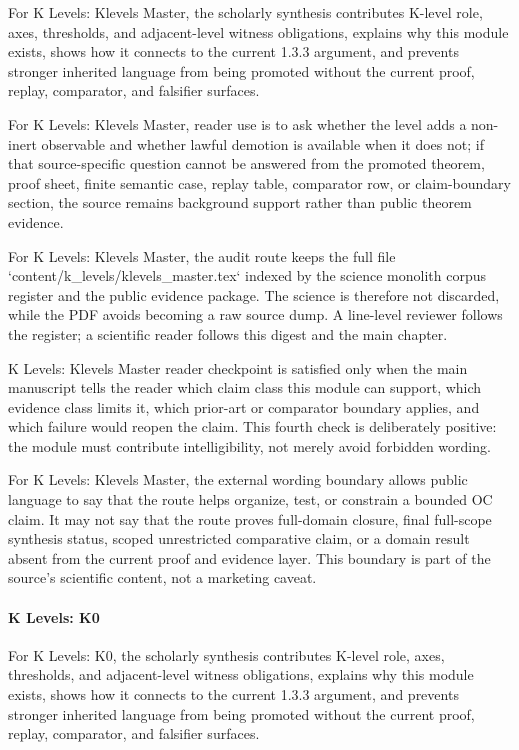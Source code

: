 For K Levels: Klevels Master, the scholarly synthesis contributes K-level role, axes, thresholds, and adjacent-level witness obligations, explains why this module exists, shows how it connects to the current 1.3.3 argument, and prevents stronger inherited language from being promoted without the current proof, replay, comparator, and falsifier surfaces.


For K Levels: Klevels Master, reader use is to ask whether the level adds a non-inert observable and whether lawful demotion is available when it does not; if that source-specific question cannot be answered from the promoted theorem, proof sheet, finite semantic case, replay table, comparator row, or claim-boundary section, the source remains background support rather than public theorem evidence.


For K Levels: Klevels Master, the audit route keeps the full file `content/k\_levels/klevels\_master.tex` indexed by the science monolith corpus register and the public evidence package. The science is therefore not discarded, while the PDF avoids becoming a raw source dump. A line-level reviewer follows the register; a scientific reader follows this digest and the main chapter.


K Levels: Klevels Master reader checkpoint is satisfied only when the main manuscript tells the reader which claim class this module can support, which evidence class limits it, which prior-art or comparator boundary applies, and which failure would reopen the claim. This fourth check is deliberately positive: the module must contribute intelligibility, not merely avoid forbidden wording.


For K Levels: Klevels Master, the external wording boundary allows public language to say that the route helps organize, test, or constrain a bounded OC claim. It may not say that the route proves full-domain closure, final full-scope synthesis status, scoped unrestricted comparative claim, or a domain result absent from the current proof and evidence layer. This boundary is part of the source's scientific content, not a marketing caveat.


\paragraph{K Levels: K0}

For K Levels: K0, the scholarly synthesis contributes K-level role, axes, thresholds, and adjacent-level witness obligations, explains why this module exists, shows how it connects to the current 1.3.3 argument, and prevents stronger inherited language from being promoted without the current proof, replay, comparator, and falsifier surfaces.


